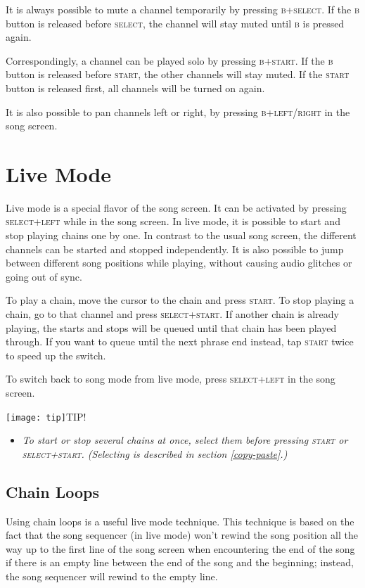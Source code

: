 It is always possible to mute a channel temporarily by pressing \textsc{b+select}. If the \textsc{b} button is released before \textsc{select}, the channel will stay muted until \textsc{b} is pressed again.

Correspondingly, a channel can be played solo by pressing \textsc{b+start}. If the \textsc{b} button is released before \textsc{start}, the other channels will stay muted. If the \textsc{start} button is released first, all channels will be turned on again.

It is also possible to pan channels left or right, by pressing \textsc{b+left/right} in the song screen.

\section{Live Mode}

 Live mode is a special flavor of the song screen. It can be activated by pressing \textsc{select+left} while in the song screen. In live mode, it is possible to start and stop playing chains one by one. In contrast to the usual song screen, the different channels can be started and stopped independently. It is also possible to jump between different song positions while playing, without causing audio glitches or going out of sync.

To play a chain, move the cursor to the chain and press \textsc{start}. To stop playing a chain, go to that channel and press \textsc{select+start}. If another chain is already playing, the starts and stops will be queued until that chain has been played through. If you want to queue until the next phrase end instead, tap \textsc{start} twice to speed up the switch.

To switch back to song mode from live mode, press \textsc{select+left} in the song screen.

\texttt{[image: tip]}TIP!
\begin{itemize}
        \item \textit{To start or stop several chains at once, select them before pressing \textsc{start} or \textsc{select+start}. (Selecting is described in section \ref{copy-paste}.)}
	\end{itemize}

\subsection{Chain Loops}

Using chain loops is a useful live mode technique. This technique is based on the fact that the song sequencer (in live mode) won't rewind the song position all the way up to the first line of the song screen when encountering the end of the song if there is an empty line between the end of the song and the beginning; instead, the song sequencer will rewind to the empty line.

